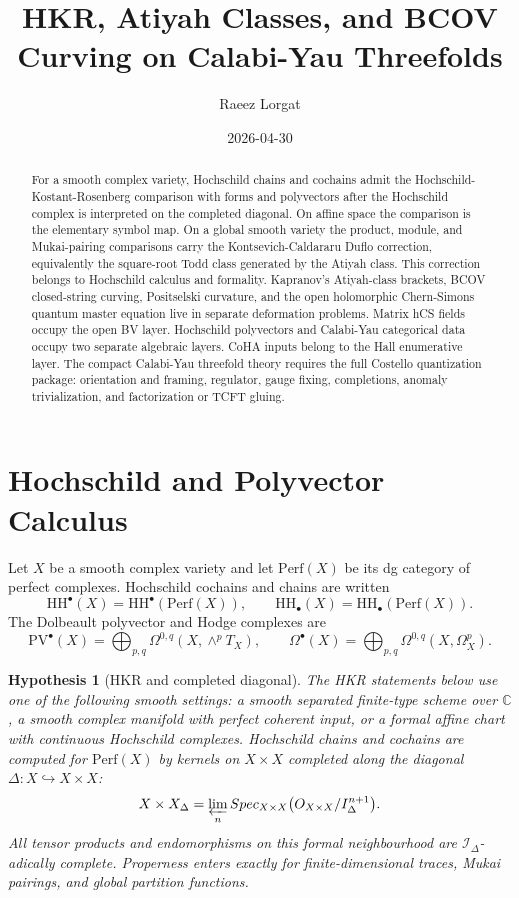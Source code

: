 \documentclass[11pt]{amsart}
\title{HKR, Atiyah Classes, and BCOV Curving on Calabi-Yau Threefolds}
\author{Raeez Lorgat}
\date{2026-04-30}
\newtheorem{hypothesis}[theorem]{Hypothesis}
\theoremstyle{definition}
\theoremstyle{remark}
\providecommand{\HH}{\mathrm{HH}}
\providecommand{\Perf}{\mathrm{Perf}}
\providecommand{\PV}{\mathrm{PV}}
\providecommand{\cO}{\mathcal O}
\providecommand{\C}{\mathbb C}
\begin{document}
\maketitle

\begin{abstract}
For a smooth complex variety, Hochschild chains and cochains admit the
Hochschild-Kostant-Rosenberg comparison with forms and polyvectors
after the Hochschild complex is interpreted on the completed diagonal.
On affine space the comparison is the elementary symbol map. On a global
smooth variety the product, module, and Mukai-pairing comparisons carry
the Kontsevich-Caldararu Duflo correction, equivalently the square-root
Todd class generated by the Atiyah class. This correction belongs to
Hochschild calculus and formality. Kapranov's Atiyah-class brackets,
BCOV closed-string curving, Positselski curvature, and the open
holomorphic Chern-Simons quantum master equation live in separate
deformation problems. Matrix hCS fields occupy the open BV layer.
Hochschild polyvectors and Calabi-Yau categorical data occupy two
separate algebraic layers. CoHA inputs belong to the Hall enumerative
layer. The compact Calabi-Yau threefold theory requires the full
Costello quantization package: orientation and framing, regulator,
gauge fixing, completions, anomaly trivialization, and factorization or
TCFT gluing.
\end{abstract}

\section{Hochschild and Polyvector Calculus}
\label{sec:hkr-calculus}

Let $X$ be a smooth complex variety and let $\Perf(X)$ be its dg
category of perfect complexes. Hochschild cochains and chains are
written
\[
  \HH^\bullet(X)=\HH^\bullet(\Perf(X)), \qquad
  \HH_\bullet(X)=\HH_\bullet(\Perf(X)).
\]
The Dolbeault polyvector and Hodge complexes are
\[
  \PV^\bullet(X)=
  \bigoplus_{p,q}\Omega^{0,q}(X,\wedge^pT_X),
  \qquad
  \Omega^\bullet(X)=
  \bigoplus_{p,q}\Omega^{0,q}(X,\Omega^p_X).
\]

\begin{hypothesis}[HKR and completed diagonal]
\label{hyp:hkr-diagonal}
The HKR statements below use one of the following smooth
settings: a smooth separated finite-type scheme over $\C$, a smooth
complex manifold with perfect coherent input, or a formal affine chart
with continuous Hochschild complexes. Hochschild chains and cochains are
computed for $\Perf(X)$ by kernels on $X\times X$ completed along the
diagonal $\Delta\colon X\hookrightarrow X\times X$:
\[
  \widehat{X\times X}_{\Delta}
  =
  \varprojlim_n
  \operatorname{Spec}_{X\times X}
  \bigl(\cO_{X\times X}/\mathcal I_\Delta^{n+1}\bigr).
\]
All tensor products and endomorphisms on this formal neighbourhood are
$\mathcal I_\Delta$-adically complete. Properness enters exactly for
finite-dimensional traces, Mukai pairings, and global partition
functions.
\end{hypothesis}
\end{document}
